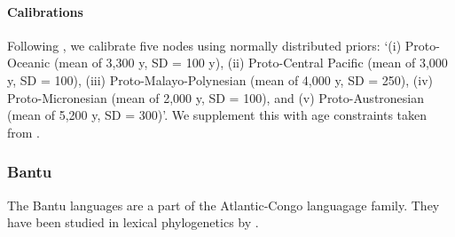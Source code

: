 \documentclass[a4paper,12pt]{scrartcl}
\begin{document}
\paragraph{Calibrations}
Following \textcite{greenhill2017evolutionary}, we calibrate five nodes using normally
distributed priors: ‘(i) Proto-Oceanic (mean of 3,300 y, SD = 100 y), (ii)
Proto-Central Pacific (mean of 3,000 y, SD = 100), (iii) Proto-Malayo-Polynesian
(mean of 4,000 y, SD = 250), (iv) Proto-Micronesian (mean of 2,000 y, SD = 100),
and (v) Proto-Austronesian (mean of 5,200 y, SD = 300)’. We supplement this with
age constraints taken from \textcite[Table S3]{gray2009language}.

\subsubsection{Bantu}
The Bantu languages are a part of the Atlantic-Congo languagage family. They
have been studied in lexical phylogenetics by
\textcite{grollemund2015bantu,greenhill2018population,currie2013cultural}.
\end{document}
